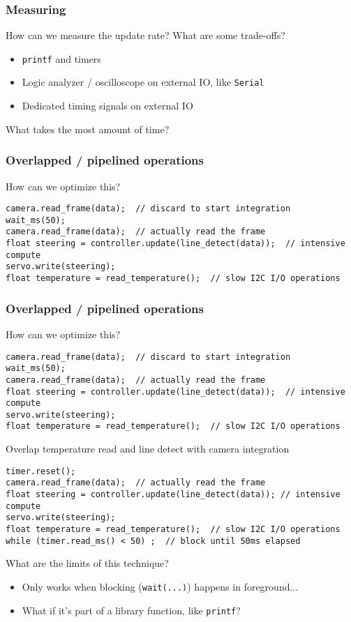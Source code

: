 \documentclass{beamer}
\begin{document}
\begin{frame}
\frametitle{Measuring}
How can we measure the update rate? What are some trade-offs? \\

 {
\begin{itemize}
  \item \texttt{printf} and timers
  \item Logic analyzer / oscilloscope on external IO, like \texttt{Serial}
  \item Dedicated timing signals on external IO
\end{itemize}
}

What takes the most amount of time?
\end{frame}


\begin{frame}[fragile]
\frametitle{Overlapped / pipelined operations}
How can we optimize this?
{\tiny \begin{lstlisting}
camera.read_frame(data);  // discard to start integration
wait_ms(50);
camera.read_frame(data);  // actually read the frame
float steering = controller.update(line_detect(data));  // intensive compute
servo.write(steering);
float temperature = read_temperature();  // slow I2C I/O operations
\end{lstlisting}
}
\end{frame}


\begin{frame}[fragile]
\frametitle{Overlapped / pipelined operations}
How can we optimize this?
{\tiny \begin{lstlisting}
camera.read_frame(data);  // discard to start integration
wait_ms(50);
camera.read_frame(data);  // actually read the frame
float steering = controller.update(line_detect(data));  // intensive compute
servo.write(steering);
float temperature = read_temperature();  // slow I2C I/O operations
\end{lstlisting}
}
\hfill \break
Overlap temperature read and line detect with camera integration
{\tiny \begin{lstlisting}
timer.reset();
camera.read_frame(data);  // actually read the frame
float steering = controller.update(line_detect(data)); // intensive compute
servo.write(steering);
float temperature = read_temperature();  // slow I2C I/O operations
while (timer.read_ms() < 50) ;  // block until 50ms elapsed
\end{lstlisting}
}

What are the limits of this technique?
 {\begin{itemize}
  \item Only works when blocking (\texttt{wait(...)}) happens in foreground... \\
  \item What if it's part of a library function, like \texttt{printf}?
\end{itemize}}
\end{frame}
\end{document}
